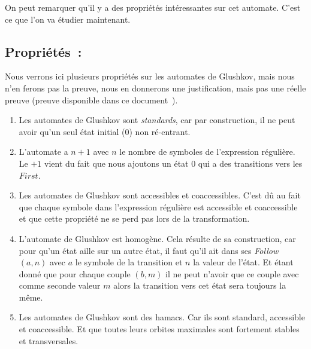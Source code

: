 \vphantom{}

On peut remarquer qu'il y a des propriétés intéressantes sur cet automate.
C'est ce que l'on va étudier maintenant.

\subsection{Propriétés~:}

Nous verrons ici plusieurs propriétés sur les automates de Glushkov, mais nous
n'en ferons pas la preuve, nous en donnerons une justification, mais pas une
réelle preuve (preuve disponible dans ce
document~\cite{DBLP:journals/tcs/CaronZ00}).

\vphantom{}

\begin{enumerate}
    \item Les automates de Glushkov sont \textit{standards}, car par construction,
      il ne peut avoir qu'un seul état initial (0) non ré-entrant.

          \vphantom{}

    \item L'automate a \(n + 1\) avec \(n\) le nombre de symboles de l'expression
      régulière. Le \(+ 1\) vient du fait que nous ajoutons un état \(0\) qui a
      des transitions vers les \(First\).

          \vphantom{}

    \item Les automates de Glushkov sont accessibles et coaccessibles. C'est dû au
      fait que chaque symbole dans l'expression régulière est accessible et
      coaccessible et que cette propriété ne se perd pas lors de la
      transformation.

          \vphantom{}

    \item L'automate de Glushkov est homogène. Cela résulte de sa construction, car
      pour qu'un état aille sur un autre état, il faut qu'il ait dans ses
      \textit{Follow} \((a, n)\) avec \(a\) le symbole de la transition et
      \(n\) la valeur de l'état. Et étant donné que pour chaque couple \((b,
      m)\) il ne peut n'avoir que ce couple avec comme seconde valeur \(m\)
      alors la transition vers cet état sera toujours la même.

          \vphantom{}

    \item Les automates de Glushkov sont des hamacs. Car ils sont standard,
      accessible et coaccessible. Et que toutes leurs orbites maximales sont
      fortement stables et transversales.

          \vphantom{}
\end{enumerate}

